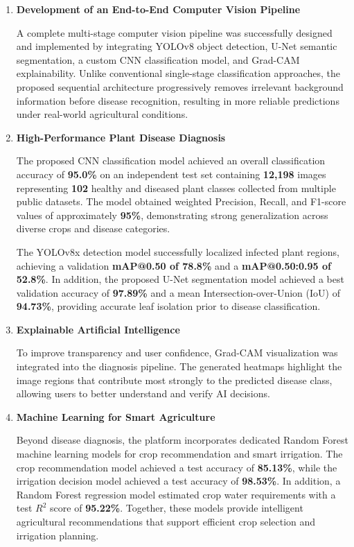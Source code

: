\begin{enumerate}[leftmargin=*,label=\textbf{A\arabic*.}]

\item \textbf{Development of an End-to-End Computer Vision Pipeline}

A complete multi-stage computer vision pipeline was successfully designed and implemented by integrating YOLOv8 object detection, U-Net semantic segmentation, a custom CNN classification model, and Grad-CAM explainability. Unlike conventional single-stage classification approaches, the proposed sequential architecture progressively removes irrelevant background information before disease recognition, resulting in more reliable predictions under real-world agricultural conditions.

\item \textbf{High-Performance Plant Disease Diagnosis}

The proposed CNN classification model achieved an overall classification accuracy of \textbf{95.0\%} on an independent test set containing \textbf{12,198} images representing \textbf{102} healthy and diseased plant classes collected from multiple public datasets. The model obtained weighted Precision, Recall, and F1-score values of approximately \textbf{95\%}, demonstrating strong generalization across diverse crops and disease categories.

The YOLOv8x detection model successfully localized infected plant regions, achieving a validation \textbf{mAP@0.50 of 78.8\%} and a \textbf{mAP@0.50:0.95 of 52.8\%}. In addition, the proposed U-Net segmentation model achieved a best validation accuracy of \textbf{97.89\%} and a mean Intersection-over-Union (IoU) of \textbf{94.73\%}, providing accurate leaf isolation prior to disease classification.

\item \textbf{Explainable Artificial Intelligence}

To improve transparency and user confidence, Grad-CAM visualization was integrated into the diagnosis pipeline. The generated heatmaps highlight the image regions that contribute most strongly to the predicted disease class, allowing users to better understand and verify AI decisions.

\item \textbf{Machine Learning for Smart Agriculture}

Beyond disease diagnosis, the platform incorporates dedicated Random Forest machine learning models for crop recommendation and smart irrigation. The crop recommendation model achieved a test accuracy of \textbf{85.13\%}, while the irrigation decision model achieved a test accuracy of \textbf{98.53\%}. In addition, a Random Forest regression model estimated crop water requirements with a test $R^2$ score of \textbf{95.22\%}. Together, these models provide intelligent agricultural recommendations that support efficient crop selection and irrigation planning.


\end{enumerate}
